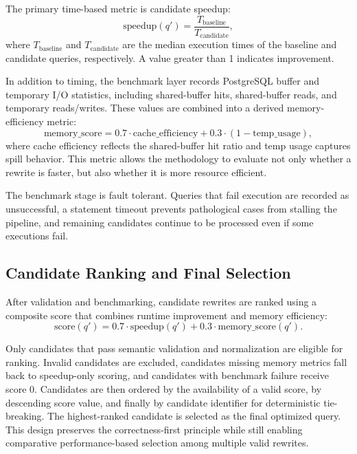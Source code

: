 The primary time-based metric is candidate speedup:
\begin{equation}
\mathrm{speedup}(q') = \frac{T_{\mathrm{baseline}}}{T_{\mathrm{candidate}}},
\end{equation}
where $T_{\mathrm{baseline}}$ and $T_{\mathrm{candidate}}$ are the median execution times of the baseline and candidate queries, respectively. A value greater than 1 indicates improvement.

In addition to timing, the benchmark layer records PostgreSQL buffer and temporary I/O statistics, including shared-buffer hits, shared-buffer reads, and temporary reads/writes. These values are combined into a derived memory-efficiency metric:
\begin{equation}
\mathrm{memory\_score} = 0.7 \cdot \mathrm{cache\_efficiency} + 0.3 \cdot (1 - \mathrm{temp\_usage}),
\end{equation}
where cache efficiency reflects the shared-buffer hit ratio and temp usage captures spill behavior. This metric allows the methodology to evaluate not only whether a rewrite is faster, but also whether it is more resource efficient.

The benchmark stage is fault tolerant. Queries that fail execution are recorded as unsuccessful, a statement timeout prevents pathological cases from stalling the pipeline, and remaining candidates continue to be processed even if some executions fail.

\subsection{Candidate Ranking and Final Selection}

After validation and benchmarking, candidate rewrites are ranked using a composite score that combines runtime improvement and memory efficiency:
\begin{equation}
\mathrm{score}(q') = 0.7 \cdot \mathrm{speedup}(q') + 0.3 \cdot \mathrm{memory\_score}(q').
\end{equation}

Only candidates that pass semantic validation and normalization are eligible for ranking. Invalid candidates are excluded, candidates missing memory metrics fall back to speedup-only scoring, and candidates with benchmark failure receive score $0$. Candidates are then ordered by the availability of a valid score, by descending score value, and finally by candidate identifier for deterministic tie-breaking. The highest-ranked candidate is selected as the final optimized query. This design preserves the correctness-first principle while still enabling comparative performance-based selection among multiple valid rewrites.

